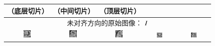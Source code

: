 \renewcommand{\captiontitle}{典型方向下的临床切面}
\begin{figure}
\begin{center}

\setlength{\tabcolsep}{1pt}

\begin{tabular}{ccccc}

\toprule
\SA{}（底层切片） & \SA{}（中间切片） & \SA{}（顶层切片） & \HLA{} & \VLA{} \\
\midrule

\multicolumn{5}{c}{未对齐方向的原始图像： $I$} \\

\includegraphics[width=0.19\textwidth]{./data/ohm/control/HCMNet_1100594/00_SAX/35_/im.png} &
\includegraphics[width=0.19\textwidth]{./data/ohm/control/HCMNet_1100823/00_SAX/33_/im.png} &
\includegraphics[width=0.19\textwidth]{./data/ohm/control/HCMNet_2600035/00_SAX/024_SA_CINE/im.png} &
\includegraphics[width=0.19\textwidth]{./data/ohm/control/HCMNet_1700012/01_HLA/00/im.png} &
\includegraphics[width=0.19\textwidth]{./data/ohm/control/HCMNet_2100096/02_VLA/00/im.png} \\


\end{tabular}
\end{center}
\end{figure}
